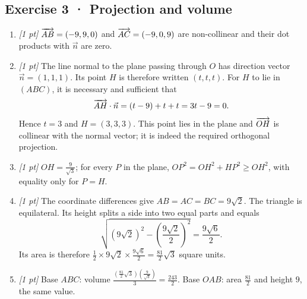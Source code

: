 \subsection*{Exercise 3 · Projection and volume}\begin{enumerate}

\item \textit{[1 pt]} $\overrightarrow{AB}=(-9,9,0)$ and $\overrightarrow{AC}=(-9,0,9)$ are non-collinear and their dot products with $\vec n$ are zero.

\item \textit{[1 pt]} The line normal to the plane passing through $O$ has direction vector $\vec n=(1,1,1)$. Its point $H$ is therefore written $(t,t,t)$. For $H$ to lie in $(ABC)$, it is necessary and sufficient that
\[\overrightarrow{AH}\cdot\vec n=(t-9)+t+t=3t-9=0.\]
Hence $t=3$ and $H=(3,3,3)$. This point lies in the plane and $\overrightarrow{OH}$ is collinear with the normal vector; it is indeed the required orthogonal projection.

\item \textit{[1 pt]} $OH=\frac{9}{\sqrt{3}}$; for every $P$ in the plane, $OP^2=OH^2+HP^2\ge OH^2$, with equality only for $P=H$.

\item \textit{[1 pt]} The coordinate differences give $AB=AC=BC=9\sqrt2$. The triangle is equilateral. Its height splits a side into two equal parts and equals
\[\sqrt{(9\sqrt2)^2-(\frac{9\sqrt{2}}{2})^2}=\frac{9\sqrt6}{2}.\]
Its area is therefore $\frac12\times 9\sqrt2\times\frac{9\sqrt6}{2}=\frac{81}{2}\sqrt3$ square units.

\item \textit{[1 pt]} Base $ABC$: volume $\frac{(\frac{81}{2}\sqrt3)(\frac{9}{\sqrt{3}})}{3}=\frac{243}{2}$. Base $OAB$: area $\frac{81}{2}$ and height $9$, the same value.

\end{enumerate}

